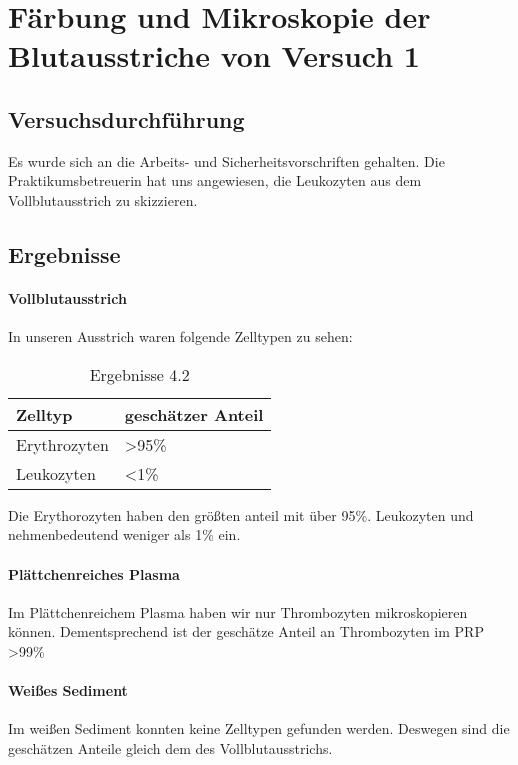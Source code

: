 %
\section{Färbung und Mikroskopie der Blutausstriche von Versuch 1}
\label{sec:Blut}


\subsection{Versuchsdurchführung}
\label{sec:Blut-V}
Es wurde sich an die Arbeits- und Sicherheitsvorschriften gehalten.
Die Praktikumsbetreuerin hat uns angewiesen, die Leukozyten aus dem Vollblutausstrich zu skizzieren.
\subsection{Ergebnisse}
\label{sec:Blut-E}

\paragraph*{Vollblutausstrich}
In unseren Ausstrich waren folgende Zelltypen zu sehen:

\begin{table}[h]
\centering
\caption{Ergebnisse 4.2}
\label{Tab:Blut-E}
\begin{tabular}{ll}
Zelltyp      & geschätzer Anteil  \\ \hline
Erythrozyten & \textgreater{}95\% \\
Leukozyten     & \textless{}1\%     \\
\end{tabular}
\end{table}

Die Erythorozyten haben den größten anteil mit über 95\%.
Leukozyten und nehmenbedeutend weniger als 1\% ein.

\paragraph*{Plättchenreiches Plasma}
Im Plättchenreichem Plasma haben wir nur Thrombozyten mikroskopieren können.
Dementsprechend ist der  geschätze Anteil an Thrombozyten im PRP \textgreater{99}\%

\paragraph*{Weißes Sediment}
Im weißen Sediment konnten keine Zelltypen gefunden werden.
Deswegen sind die geschätzen Anteile gleich dem des Vollblutausstrichs.


